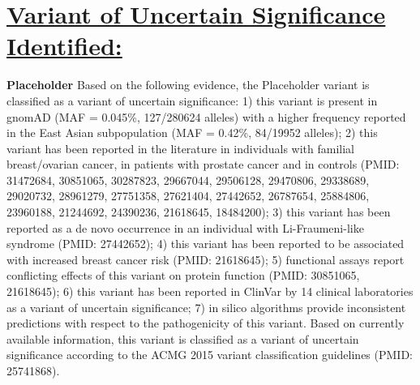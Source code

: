\documentclass[9pt]{extarticle}
\begin{document}
\section*{\underline {Variant of Uncertain Significance Identified:}\newline}
{\bf Placeholder}
\newline
Based on the following evidence, the Placeholder variant is classified as a variant of uncertain significance: 1) this variant is present in gnomAD (MAF = 0.045\%, 127/280624 alleles) with a higher frequency reported in the East Asian subpopulation (MAF = 0.42\%, 84/19952 alleles); 2) this variant has been reported in the literature in individuals with familial breast/ovarian cancer, in patients with prostate cancer and in controls (PMID: 31472684, 30851065, 30287823, 29667044, 29506128, 29470806, 29338689, 29020732, 28961279, 27751358, 27621404, 27442652, 26787654, 25884806, 23960188, 21244692, 24390236, 21618645, 18484200); 3) this variant has been reported as a de novo occurrence in an individual with Li-Fraumeni-like syndrome (PMID: 27442652); 4) this variant has been reported to be associated with increased breast cancer risk (PMID: 21618645); 5) functional assays report conflicting effects of this variant on protein function (PMID: 30851065, 21618645); 6) this variant has been reported in ClinVar by 14 clinical laboratories as a variant of uncertain significance; 7) in silico algorithms provide inconsistent predictions with respect to the pathogenicity of this variant. Based on currently available information, this variant is classified as a variant of uncertain significance according to the ACMG 2015 variant classification guidelines (PMID: 25741868). 
\newline
\newline
\newline
\end{document}

